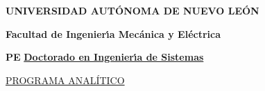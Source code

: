 \begin{tcolorbox}
  \begin{center}
    {\bf UNIVERSIDAD AUT\'{O}NOMA DE NUEVO LE\'{O}N}

    \medskip

    {\bf Facultad de Ingenier\'{\i}a Mec\'{a}nica y El\'{e}ctrica}

    \medskip
    
    {\bf PE} \underline{\bf Doctorado en Ingenier\'{\i}a de Sistemas}

    \medskip

    \underline{PROGRAMA ANAL\'{I}TICO}
  \end{center}
\end{tcolorbox}
